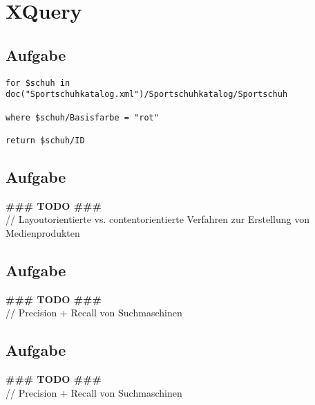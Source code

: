 

\section{XQuery}

\subsection{Aufgabe}

\lstset{language=SQL}
\begin{lstlisting}
for $schuh in doc("Sportschuhkatalog.xml")/Sportschuhkatalog/Sportschuh

where $schuh/Basisfarbe = "rot"

return $schuh/ID
\end{lstlisting} %


\subsection{Aufgabe}

\textbf{\#\#\# TODO \#\#\#}\\
// Layoutorientierte vs. contentorientierte Verfahren zur Erstellung von Medienprodukten

\subsection{Aufgabe}

\textbf{\#\#\# TODO \#\#\#}\\
// Precision + Recall von Suchmaschinen


\subsection{Aufgabe}

\textbf{\#\#\# TODO \#\#\#}\\
// Precision + Recall von Suchmaschinen



